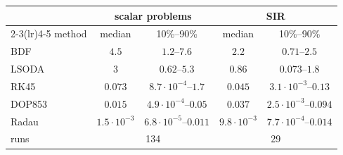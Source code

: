 \begin{tabular}{lcccc}
\toprule
& \multicolumn{2}{c}{scalar problems} & \multicolumn{2}{c}{SIR}\\
\cmidrule(lr){2-3}\cmidrule(lr){4-5}
method & median & 10\%--90\% & median & 10\%--90\% \\
\midrule
BDF & $4.5$ & $1.2$--$7.6$ & $2.2$ & $0.71$--$2.5$ \\
LSODA & $3$ & $0.62$--$5.3$ & $0.86$ & $0.073$--$1.8$ \\
RK45 & $0.073$ & $8.7\cdot10^{-4}$--$1.7$ & $0.045$ & $3.1\cdot10^{-3}$--$0.13$ \\
DOP853 & $0.015$ & $4.9\cdot10^{-4}$--$0.05$ & $0.037$ & $2.5\cdot10^{-3}$--$0.094$ \\
Radau & $1.5\cdot10^{-3}$ & $6.8\cdot10^{-5}$--$0.011$ & $9.8\cdot10^{-3}$ & $7.7\cdot10^{-4}$--$0.014$ \\
\midrule
runs & \multicolumn{2}{c}{134} & \multicolumn{2}{c}{29}\\
\bottomrule
\end{tabular}

